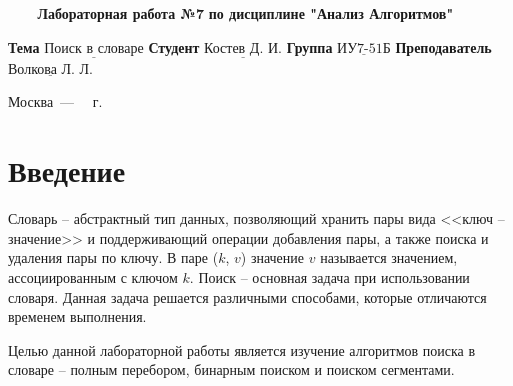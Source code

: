\documentclass[a4paper,14pt, unknownkeysallowed]{extreport}
\begin{document}
\begin{titlepage}
	
	\begin{center}
		\noindent\begin{minipage}{1.3\textwidth}\centering
		\Large\textbf{   ~~~ Лабораторная работа №7}\newline
		\textbf{по дисциплине "Анализ Алгоритмов"}\newline\newline\newline
		\end{minipage}
	\end{center}
	
	\noindent\textbf{Тема} 			$\underline{\text{Поиск в словаре}}$\newline\newline
	\noindent\textbf{Студент} 		$\underline{\text{Костев Д. И.}}$\newline\newline
	\noindent\textbf{Группа} 		$\underline{\text{ИУ7-51Б}}$\newline\newline
	\noindent\textbf{Преподаватель} $\underline{\text{Волкова Л. Л.}}$\newline
	
	\begin{center}
		\vfill
		Москва~---~\the\year
		~г.
	\end{center}
	\restoregeometry
\end{titlepage}



\renewcommand{\contentsname}{Содержание} 
\tableofcontents
\setcounter{page}{2}





\chapter*{Введение}

Словарь -- абстрактный тип данных, позволяющий хранить пары вида <<ключ -- значение>> и поддерживающий операции добавления пары, а также поиска и удаления пары по ключу.
В паре ($k$, $v$) значение $v$ называется значением, ассоциированным с ключом $k$. Поиск -- основная задача при использовании словаря. Данная задача решается различными способами, которые отличаются временем выполнения.

Целью данной лабораторной работы является изучение алгоритмов поиска в словаре – полным перебором, бинарным поиском и поиском сегментами. 
\end{document}
